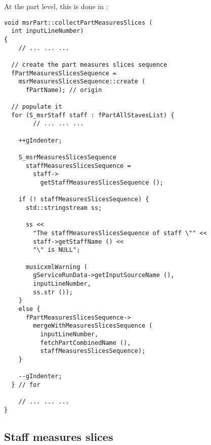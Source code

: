 At the part level, this is done in :
\begin{lstlisting}[language=CPlusPlus]
void msrPart::collectPartMeasuresSlices (
  int inputLineNumber)
{
	// ... ... ...

  // create the part measures slices sequence
  fPartMeasuresSlicesSequence =
    msrMeasuresSlicesSequence::create (
      fPartName); // origin

  // populate it
  for (S_msrStaff staff : fPartAllStavesList) {
		// ... ... ...

    ++gIndenter;

    S_msrMeasuresSlicesSequence
      staffMeasuresSlicesSequence =
        staff->
          getStaffMeasuresSlicesSequence ();

    if (! staffMeasuresSlicesSequence) {
      std::stringstream ss;

      ss <<
        "The staffMeasuresSlicesSequence of staff \"" <<
        staff->getStaffName () <<
        "\" is NULL";

      musicxmlWarning (
        gServiceRunData->getInputSourceName (),
        inputLineNumber,
        ss.str ());
    }
    else {
      fPartMeasuresSlicesSequence->
        mergeWithMeasuresSlicesSequence (
          inputLineNumber,
          fetchPartCombinedName (),
          staffMeasuresSlicesSequence);
    }

    --gIndenter;
  } // for

	// ... ... ...
}
\end{lstlisting}


\subsection{Staff measures slices}


